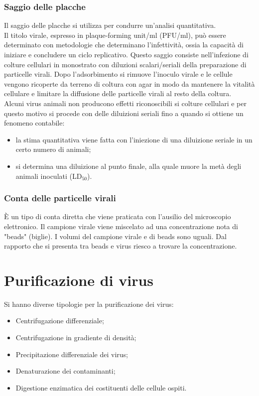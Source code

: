 \subsubsection{Saggio delle placche}
Il saggio delle placche si utilizza per condurre un'analisi quantitativa. 
\\Il titolo virale, espresso in plaque-forming unit/ml (PFU/ml), può essere determinato con metodologie che determinano l'infettività, ossia la capacità di iniziare e concludere un ciclo replicativo. Questo saggio consiste nell'infezione di colture cellulari in monostrato con diluzioni scalari/seriali della preparazione di particelle virali. Dopo l'adsorbimento si rimuove l'inoculo virale e le cellule vengono ricoperte da terreno di coltura con agar in modo da mantenere la vitalità cellulare e limitare la diffusione delle particelle virali al resto della coltura. 
\\Alcuni virus animali non producono effetti riconoscibili si colture cellulari e per questo motivo si procede con delle diluizioni seriali fino a quando si ottiene un fenomeno contabile:
\begin{itemize}
    \item la stima quantitativa viene fatta con l'iniezione di una diluizione seriale in un certo numero di animali; 
    \item si determina una diluizione al punto finale, alla quale muore la metà degli animali inoculati (LD$_50$).
\end{itemize}
\subsubsection{Conta delle particelle virali}
\`E un tipo di conta diretta che viene praticata con l'ausilio del microscopio elettronico. Il campione virale viene miscelato ad una concentrazione nota di "beads" (biglie). I volumi del campione virale e di beads sono uguali. Dal rapporto che si presenta tra beads e virus riesco a trovare la concentrazione. 
\section{Purificazione di virus}
Si hanno diverse tipologie per la purificazione dei virus:
\begin{itemize}
    \item Centrifugazione differenziale;
    \item Centrifugazione in gradiente di densità;
    \item Precipitazione differenziale dei virus;
    \item Denaturazione dei contaminanti; 
    \item Digestione enzimatica dei costituenti delle cellule ospiti.
\end{itemize}
